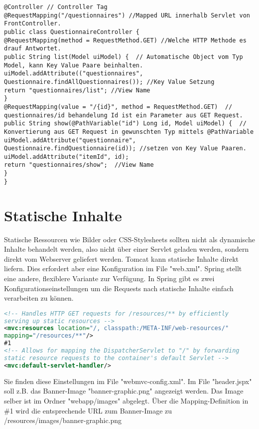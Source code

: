 \documentclass[a4paper,10pt]{scrreprt}
\begin{document}
\begin{lstlisting}[caption=Controller Example]
 @Controller // Controller Tag
@RequestMapping("/questionnaires") //Mapped URL innerhalb Servlet von FrontController.
public class QuestionnaireController {
@RequestMapping(method = RequestMethod.GET) //Welche HTTP Methode es drauf Antwortet.
public String list(Model uiModel) {  // Automatische Object vom Typ Model, kann Key Value Paare beinhalten.
uiModel.addAttribute(("questionnaires", 
Questionnaire.findAllQuestionnaires()); //Key Value Setzung
return "questionnaires/list"; //View Name
} 
@RequestMapping(value = "/{id}", method = RequestMethod.GET)  // questionnaires/id behandelung Id ist ein Parameter aus GET Request.
public String show(@PathVariable("id") Long id, Model uiModel) {  // Konvertierung aus GET Request in gewunschten Typ mittels @PathVariable
uiModel.addAttribute("questionnaire", 
Questionnaire.findQuestionnaire(id)); //setzen von Key Value Paaren.
uiModel.addAttribute("itemId", id); 
return "questionnaires/show";  //View Name
} 
}
\end{lstlisting}

\section{Statische Inhalte}

Statische Ressourcen wie Bilder oder CSS-Stylesheets sollten nicht als dynamische Inhalte
behandelt werden, also nicht über einer Servlet geladen werden, sondern direkt vom Webserver
geliefert werden. Tomcat kann statische Inhalte direkt liefern. Dies erfordert aber eine Konfiguration
im File "web.xml". Spring stellt eine andere, flexiblere Variante zur Verfügung.
In Spring gibt es zwei Konfigurationseinstellungen um die Requests nach statische Inhalte einfach
verarbeiten zu können.

\begin{lstlisting}[language=xml,caption=Statische Inhalt Konfiguration]
 <!-- Handles HTTP GET requests for /resources/** by efficiently
serving up static resources -->
<mvc:resources location="/, classpath:/META-INF/web-resources/"
mapping="/resources/**"/>
#1
<!-- Allows for mapping the DispatcherServlet to "/" by forwarding
static resource requests to the container's default Servlet -->
<mvc:default-servlet-handler/>
\end{lstlisting}
Sie finden diese Einstellungen im File "webmvc-config.xml".
Im File "header.jspx" soll z.B. das Banner-Image "banner-graphic.png" angezeigt werden. Das
Image selber ist im Ordner "webapp/images" abgelegt. Über die Mapping-Definition in \#1 wird die
entsprechende URL zum Banner-Image zu /resources/images/banner-graphic.png
\end{document}
